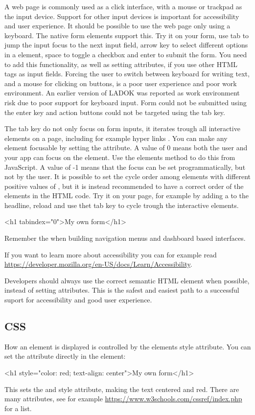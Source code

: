 \documentclass[fleqn, article, a4paper]{memoir}
\begin{document}
A web page is commonly used as a click interface, with a mouse or trackpad as the input device. Support for other input devices is important for accessibility and user experience. It should be possible to use the web page only using a keyboard. The native form elements support this. Try it on your form, use tab to jump the input focus to the next input field, arrow key to select different options in a  element, space to toggle a checkbox and enter to submit the form. You need to add this functionality, as well as setting  attributes, if you use other HTML tags as input fields. Forcing the user to switch between keyboard for writing text, and a mouse for clicking on buttons, is a poor user experience and poor work environment. An earlier version of LADOK was reported as work environment risk due to poor support for keyboard input. Form could not be submitted using the enter key and action buttons could not be targeted using the tab key.

The tab key do not only focus on form inputs, it iterates trough all interactive elements on a page, including for example hyper links . You can make any element focusable by setting the  attribute. A value of 0 means both the user and your app can focus on the element. Use the elements  method to do this from JavaScript. A value of -1 means that the focus can be set programmatically, but not by the user. It is possible to set the cycle order among elements with different positive values of , but it is instead recommended to have a correct order of the elements in the HTML code. Try it on your page, for example by adding a  to the headline, reload and use thet tab key to cycle trough the interactive elements.
\begin{Code}
<h1 tabindex="0">My own form</h1>
\end{Code}
Remember the  when building navigation menus and dashboard based interfaces.

If you want to learn more about accessibility you can for example read \url{https://developer.mozilla.org/en-US/docs/Learn/Accessibility}.

Developers should always use the correct semantic HTML element when possible, instead of setting  attributes. This is the safest and easiest path to a successful suport for accessibility and good user experience.

\subsection*{CSS}
How an element is displayed is controlled by the elements style attribute. You can set the attribute directly in the element: 
\begin{Code}
<h1 style="color: red; text-align: center">My own form</h1>
\end{Code}
This sets the  and  style attribute, making the text centered and red. There are many attributes, see for example \url{https://www.w3schools.com/cssref/index.php} for a list.
\end{document}
